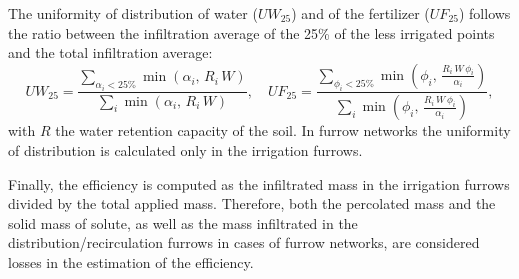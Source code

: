 \documentclass[review,authoryear]{elsarticle}
\newcommand{\eq}[2]{\begin{equation}\label{#2}#1\end{equation}}
\newcommand{\PA}[1] {\left(#1\right)}
\begin{document}
The uniformity of distribution of water ($UW_{25}$) and of the fertilizer
($UF_{25}$) follows the ratio between the infiltration average of the 25\% of
the less irrigated points and the total infiltration average:
\eq
{
	UW_{25}=\frac{\displaystyle\sum_{\alpha_i<25\%}\min\PA{\alpha_i,\,R_i\,W}}
		{\displaystyle\sum_i\min\PA{\alpha_i,\,R_i\,W}},\quad
	UF_{25}=\frac{\displaystyle
		\sum_{\phi_i<25\%}\min\PA{\phi_i,\,\frac{R_i\,W\,\phi_i}{\alpha_i}}}
		{\displaystyle\sum_i\min\PA{\phi_i,\,\frac{R_i\,W\,\phi_i}{\alpha_i}}},
}{EqUniformity}
with $R$ the water retention capacity of the soil. In furrow networks the
uniformity of distribution is calculated only in the irrigation furrows.

Finally, the efficiency is computed as the infiltrated mass in the irrigation
furrows divided by the total applied mass. Therefore, both the percolated mass
and the solid mass of solute, as well as the mass infiltrated in the
distribution/recirculation furrows in cases of furrow networks, are considered
losses in the estimation of the efficiency. 
\end{document}
